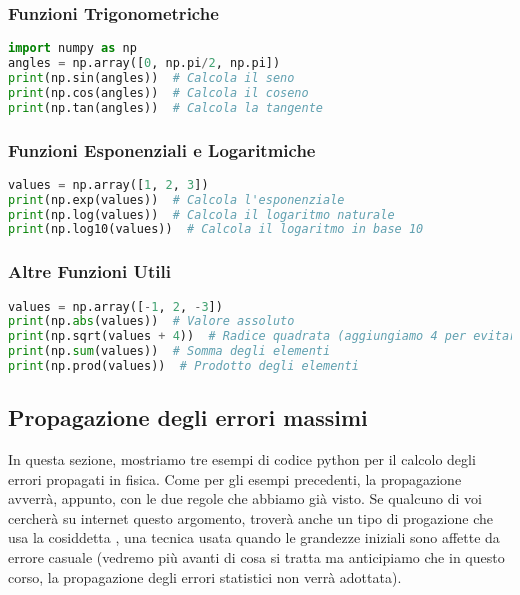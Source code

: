 \subsubsection{Funzioni Trigonometriche}
\begin{lstlisting}[language=Python]
import numpy as np
angles = np.array([0, np.pi/2, np.pi])
print(np.sin(angles))  # Calcola il seno
print(np.cos(angles))  # Calcola il coseno
print(np.tan(angles))  # Calcola la tangente
\end{lstlisting}

\subsubsection{Funzioni Esponenziali e Logaritmiche}
\begin{lstlisting}[language=Python]
values = np.array([1, 2, 3])
print(np.exp(values))  # Calcola l'esponenziale
print(np.log(values))  # Calcola il logaritmo naturale
print(np.log10(values))  # Calcola il logaritmo in base 10
\end{lstlisting}



\subsubsection{Altre Funzioni Utili}
\begin{lstlisting}[language=Python]
values = np.array([-1, 2, -3])
print(np.abs(values))  # Valore assoluto
print(np.sqrt(values + 4))  # Radice quadrata (aggiungiamo 4 per evitare valori negativi)
print(np.sum(values))  # Somma degli elementi
print(np.prod(values))  # Prodotto degli elementi
\end{lstlisting}

\subsection{Propagazione degli errori massimi}
In questa sezione, mostriamo tre esempi di codice python per il calcolo degli errori propagati in fisica. Come per gli esempi precedenti, la propagazione avverrà, appunto, con le due regole che abbiamo già visto. Se qualcuno di voi cercherà su internet questo argomento, troverà  anche un tipo di progazione che usa la cosiddetta , una tecnica usata quando le grandezze iniziali sono affette da errore casuale (vedremo più avanti di cosa si tratta ma anticipiamo che in questo corso, la propagazione degli errori statistici non verrà adottata).


